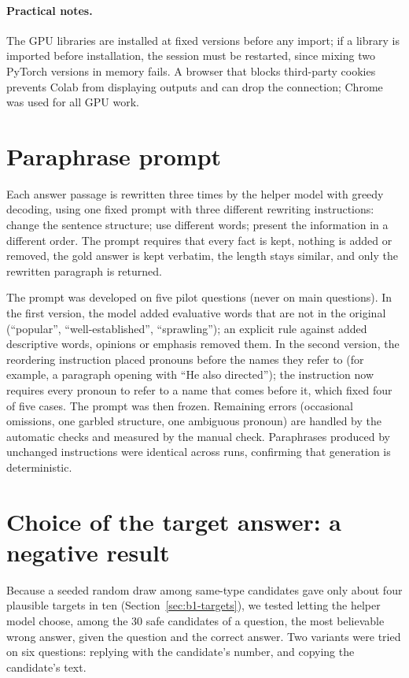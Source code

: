 \documentclass[11pt,a4paper]{report}
\begin{document}
\paragraph{Practical notes.}
The GPU libraries are installed at fixed versions before any import; if a
library is imported before installation, the session must be restarted, since
mixing two PyTorch versions in memory fails. A browser that blocks third-party
cookies prevents Colab from displaying outputs and can drop the connection;
Chrome was used for all GPU work.

\section{Paraphrase prompt}\label{sec:b2-prompt}
Each answer passage is rewritten three times by the helper model with greedy
decoding, using one fixed prompt with three different rewriting instructions:
change the sentence structure; use different words; present the information
in a different order. The prompt requires that every fact is kept, nothing is
added or removed, the gold answer is kept verbatim, the length stays similar,
and only the rewritten paragraph is returned.

The prompt was developed on five pilot questions (never on main questions).
In the first version, the model added evaluative words that are not in the
original (``popular'', ``well-established'', ``sprawling''); an explicit rule
against added descriptive words, opinions or emphasis removed them. In the
second version, the reordering instruction placed pronouns before the names
they refer to (for example, a paragraph opening with ``He also directed''); the
instruction now requires every pronoun to refer to a name that comes before
it, which fixed four of five cases. The prompt was then frozen. Remaining
errors (occasional omissions, one garbled structure, one ambiguous pronoun)
are handled by the automatic checks and measured by the manual check.
Paraphrases produced by unchanged instructions were identical across runs,
confirming that generation is deterministic.

\section{Choice of the target answer: a negative result}\label{sec:b2-target}
Because a seeded random draw among same-type candidates gave only about four
plausible targets in ten (Section~\ref{sec:b1-targets}), we tested letting the
helper model choose, among the 30 safe candidates of a question, the most
believable wrong answer, given the question and the correct answer. Two
variants were tried on six questions: replying with the candidate's number,
and copying the candidate's text.
\end{document}

